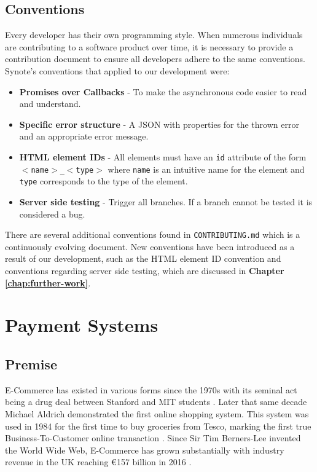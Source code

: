 \subsection{Conventions}
\label{subsec:conventions}

Every developer has their own programming style. When numerous individuals are contributing to a software product over time, it is necessary to provide a contribution document to ensure all developers adhere to the same conventions. Synote's conventions that applied to our development were:

\begin{itemize}
    \item \textbf{Promises over Callbacks} - To make the asynchronous code easier to read and understand.
    \item \textbf{Specific error structure} - A JSON with properties for the thrown error and an appropriate error message.
    \item \textbf{HTML element IDs} - All elements must have an \texttt{id} attribute of the form  \texttt{$<$name$>$\_$<$type$>$} where \texttt{name} is an intuitive name for the element and \texttt{type} corresponds to the type of the element.
    \item \textbf{Server side testing} - Trigger all branches. If a branch cannot be tested it is considered a bug.
\end{itemize}

There are several additional conventions found in \texttt{CONTRIBUTING.md} which is a continuously evolving document. New conventions have been introduced as a result of our development, such as the HTML element ID convention and conventions regarding server side testing, which are discussed in \textbf{Chapter \ref{chap:further-work}}.

\section{Payment Systems}
\label{sec:payment-systems}


\subsection{Premise}
\label{sec:payment-intro}

E-Commerce has existed in various forms since the 1970s with its seminal act being a drug deal between Stanford and MIT students \cite{power-mike-online-highs}. Later that same decade Michael Aldrich demonstrated the first online shopping system. This system was used in 1984 for the first time to buy groceries from Tesco, marking the first true Business-To-Customer online transaction \cite{winterman-kelly-online-shopper}. Since Sir Tim Berners-Lee invented the World Wide Web, E-Commerce has grown substantially with industry revenue in the UK reaching \euro{157 billion} in 2016 \cite{khaksar-2016}.\\

